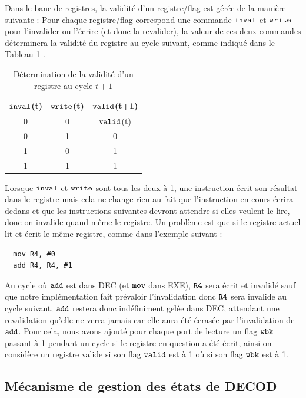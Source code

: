 \documentclass{article}
\begin{document}
Dans le banc de registres, la validité d'un registre/flag est gérée de la manière suivante :
Pour chaque registre/flag correspond une commande $\tt{inval}$ et $\tt{write}$
pour l'invalider ou l'écrire
(et donc la revalider), la valeur de ces deux commandes déterminera la validité du registre
au cycle suivant, comme indiqué dans le Tableau \ref{valid} .

\begin{table}[H]
\centering
\begingroup
\setlength{\tabcolsep}{5pt}
\renewcommand{\arraystretch}{1.1}
\begin{tabular}{ | c | c | c | }
\hline
$\tt{inval}$(t) & $\tt{write}$(t)  & $\tt{valid}$(t+1) \\
\hline
0  & 0  & $\tt{valid}$(t) \\
0  & 1  & 0        \\
1  & 0  & 1        \\
1  & 1  & 1        \\
\hline
\end{tabular}
\endgroup
\caption{Détermination de la validité d'un registre au cycle $t+1$}
\label{valid}
\end{table}


Lorsque $\tt{inval}$ et $\tt{write}$ sont tous les deux à 1,
une instruction écrit son résultat
dans le registre mais cela ne change rien au fait que l'instruction en cours écrira dedans
et que les instructions suivantes devront attendre si elles veulent le lire, donc on
invalide quand même le registre.
Un problème est que si le registre actuel lit et écrit le même registre, comme
dans l'exemple suivant :

\begin{lstlisting}
  mov R4, #0
  add R4, R4, #1
\end{lstlisting}

Au cycle où $\tt{add}$ est dans DEC (et $\tt{mov}$ dans EXE),
$\tt{R4}$ sera écrit et invalidé sauf que notre
implémentation fait prévaloir l'invalidation donc $\tt{R4}$ sera invalide au cycle suivant,
$\tt{add}$ restera donc indéfiniment gelée dans DEC,
attendant une revalidation qu'elle ne verra jamais car elle aura été écrasée par l'invalidation de
$\tt{add}$.
Pour cela, nous avons ajouté pour chaque port de lecture un flag $\tt{wbk}$ passant à 1 pendant un cycle
si le registre en question a été écrit, ainsi on considère un registre valide si son flag $\tt{valid}$
est à 1 où si son flag $\tt{wbk}$ est à 1.

\subsection{Mécanisme de gestion des états de DECOD}
\end{document}
